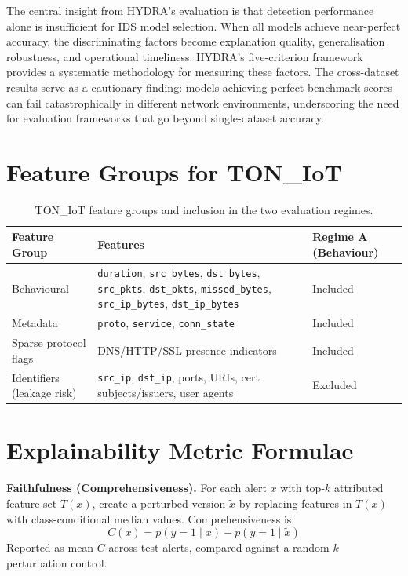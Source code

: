 \documentclass[12pt,a4paper]{report}
\begin{document}
The central insight from HYDRA's evaluation is that detection performance alone is insufficient for IDS model selection. When all models achieve near-perfect accuracy, the discriminating factors become explanation quality, generalisation robustness, and operational timeliness. HYDRA's five-criterion framework provides a systematic methodology for measuring these factors. The cross-dataset results serve as a cautionary finding: models achieving perfect benchmark scores can fail catastrophically in different network environments, underscoring the need for evaluation frameworks that go beyond single-dataset accuracy.

\appendix

\chapter{Feature Groups for TON\_IoT}
\label{app:features}

\begin{table}[H]
\centering
\caption{TON\_IoT feature groups and inclusion in the two evaluation regimes.}
\label{tab:features}
\begin{tabular}{p{3.5cm}p{6cm}p{3cm}}
\toprule
\textbf{Feature Group} & \textbf{Features} & \textbf{Regime A (Behaviour)} \\
\midrule
Behavioural & \texttt{duration}, \texttt{src\_bytes}, \texttt{dst\_bytes}, \texttt{src\_pkts}, \texttt{dst\_pkts}, \texttt{missed\_bytes}, \texttt{src\_ip\_bytes}, \texttt{dst\_ip\_bytes} & Included \\
\addlinespace
Metadata & \texttt{proto}, \texttt{service}, \texttt{conn\_state} & Included \\
\addlinespace
Sparse protocol flags & DNS/HTTP/SSL presence indicators & Included \\
\addlinespace
Identifiers (leakage risk) & \texttt{src\_ip}, \texttt{dst\_ip}, ports, URIs, cert subjects/issuers, user agents & Excluded \\
\bottomrule
\end{tabular}
\end{table}

\chapter{Explainability Metric Formulae}
\label{app:formulae}

\noindent\textbf{Faithfulness (Comprehensiveness).} For each alert $x$ with top-$k$ attributed feature set $T(x)$, create a perturbed version $\tilde{x}$ by replacing features in $T(x)$ with class-conditional median values. Comprehensiveness is:
\begin{equation}
C(x) = p(y=1 \mid x) - p(y=1 \mid \tilde{x})
\end{equation}
Reported as mean $C$ across test alerts, compared against a random-$k$ perturbation control.
\end{document}
